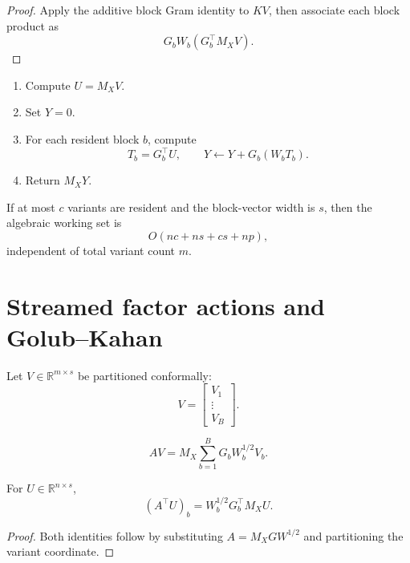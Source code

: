 \begin{proof}
Apply the additive block Gram identity to \(KV\), then associate each block
product as
\[
G_bW_b(G_b^\top M_XV).
\]
\end{proof}

\begin{algorithm}[Streamed \(KV\)]\label{claim:final-9-2}
\begin{enumerate}[label=\arabic*.]
\item Compute \(U=M_XV\).
\item Set \(Y=0\).
\item For each resident block \(b\), compute
\[
T_b=G_b^\top U,
\qquad
Y\leftarrow Y+G_b(W_bT_b).
\]
\item Return \(M_XY\).
\end{enumerate}
\end{algorithm}

\begin{corollary}\label{claim:final-9-3}
If at most \(c\) variants are resident and the block-vector width is \(s\),
then the algebraic working set is
\[
\boxed{
O(nc+ns+cs+np),
}
\]
independent of total variant count \(m\).
\end{corollary}


\section{Streamed factor actions and Golub--Kahan}\label{sec:final-10}

Let \(V\in\mathbb R^{m\times s}\) be partitioned conformally:
\[
V=
\begin{bmatrix}
V_1\\
\vdots\\
V_B
\end{bmatrix}.
\]

\begin{theorem}[Streamed \(AV\)]\label{claim:final-10-1}
\[
\boxed{
AV
=
M_X
\sum_{b=1}^B
G_bW_b^{1/2}V_b.
}
\]
\end{theorem}

\begin{theorem}\label{claim:final-10-2}
For \(U\in\mathbb R^{n\times s}\),
\[
\boxed{
(A^\top U)_b
=
W_b^{1/2}G_b^\top M_XU.
}
\]
\end{theorem}

\begin{proof}
Both identities follow by substituting
\(A=M_XGW^{1/2}\) and partitioning the variant coordinate.
\end{proof}


